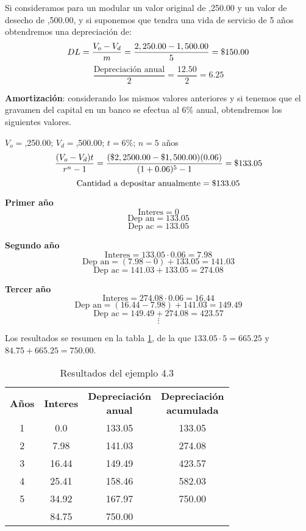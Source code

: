 \begin{example}
    Si consideramos para un modular un valor original de ,250.00 y un valor de desecho de ,500.00,
    y si suponemos que tendra una vida de servicio de 5 años obtendremos una depreciación de:
    \[DL=\frac{V_o-V_d}{m}=\frac{2,250.00-1,500.00}{5}=\text{\textdollar}150.00\]
    \[\frac{\text{Depreciación anual}}{2}=\frac{12.50}{2}=6.25\]
    
    \textbf{Amortización}: considerando los mismos valores anteriores y si tenemos que el gravamen del capital en un banco se efectua al 6\% anual,
    obtendremos los siguientes valores.

    $V_o=$,250.00; $V_d=$,500.00; $t=6\%$; $n=5$ años
    \[\frac{(V_o-V_d)t}{r^n-1}=\frac{(\text{\textdollar}2,2500.00-\text{\textdollar}1,500.00)(0.06)}{(1+0.06)^5-1}=\text{\textdollar}133.05\]
    \[\text{Cantidad a depositar anualmente}=\text{\textdollar}133.05\]
    
    \textbf{Primer año}
    \[\text{Interes}=0\]
    \[\text{Dep an}=133.05\]
    \[\text{Dep ac}=133.05\]

    \textbf{Segundo año}
    \[\text{Interes}=133.05\cdot0.06=7.98\]
    \[\text{Dep an}=(7.98-0)+133.05=141.03\]
    \[\text{Dep ac}=141.03+133.05=274.08\]

    \textbf{Tercer año}
    \[\text{Interes}=274.08\cdot0.06=16.44\]
    \[\text{Dep an}=(16.44-7.98)+141.03=149.49\]
    \[\text{Dep ac}=149.49+274.08=423.57\]
    \[\vdots\]

    Los resultados se resumen en la tabla \ref{tab:ejemplo1pdf}, de la que $133.05\cdot5=665.25$ y $84.75+665.25=750.00$.
    \begin{table}
        \centering
        \begin{tabular}{c c c c}
            \textbf{Años} & \textbf{Interes} & \makecell{\textbf{Depreciación}\\\textbf{anual}} & \makecell{\textbf{Depreciación}\\\textbf{acumulada}} \\
            1 & 0.0 & 133.05 & 133.05 \\
            2 & 7.98 & 141.03 & 274.08 \\
            3 & 16.44 & 149.49 & 423.57 \\
            4 & 25.41 & 158.46 & 582.03 \\
            5 & 34.92 & 167.97 & 750.00 \\
            \cline{2-3}
            & 84.75 & 750.00 &
        \end{tabular}
        \caption{Resultados del ejemplo 4.3}
        \label{tab:ejemplo1pdf}
    \end{table}
\end{example}
